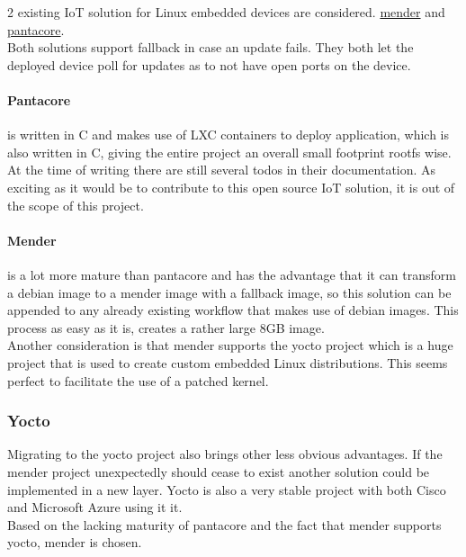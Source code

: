 \documentclass[../../main.tex]{subfiles}
\begin{document}
2 existing IoT solution for Linux embedded devices are considered.
\href{mender.io}{mender} and \href{pantahub.com}{pantacore}.\\

Both solutions support fallback in case an update fails.
They both let the deployed device poll for updates as to not have open ports on the device.

\paragraph{Pantacore}%
\label{par:pantacore}

is written in C and makes use of LXC containers to deploy application, which is also written in C,
giving the entire project an overall small footprint rootfs wise.\\
At the time of writing there are still several todos in their documentation. As exciting as it
would be to contribute to this open source IoT solution, it is out of the scope of this project.


\paragraph{Mender}%
\label{par:mender}

is a lot more mature than pantacore and has the advantage that it can transform a debian image
to a mender image with a fallback image, so this solution can be appended to any already 
existing workflow that makes use of debian images. This process as easy as it is, creates a
rather large 8GB image.\\

Another consideration is that mender supports the yocto project which is a huge project that is
used to create custom embedded Linux distributions. This seems perfect to facilitate the use of
a patched kernel.\\

\subsubsection{Yocto}%
\label{ssub:yocto}

Migrating to the yocto project also brings other less obvious advantages.
If the mender project unexpectedly should cease to exist another solution could
be implemented in a new layer.
Yocto is also a very stable project with both Cisco and Microsoft Azure using it it.
\\


Based on the lacking maturity of pantacore and the fact that mender supports yocto, mender is
chosen.
\end{document}

